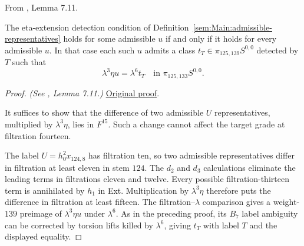 \begin{lemma}
\label{paper:7.11}
From \cite{LWX126}, Lemma 7.11.\par

\label{lem:equistate5}
The eta-extension detection condition of
Definition~\ref{sem:Main:admissible-representatives} holds for some
admissible $u$ if and only if it holds for every admissible $u$.
In that case each such $u$ admits a class
$t_T\in\pi_{125,139}S^{0,0}$ detected by $T$ such that
\[
 \lambda^3\eta u=\lambda^6t_T\quad\text{in }\pi_{125,133}S^{0,0}.
\]



\end{lemma}
\begin{proof}
\textit{(See \cite{LWX126}, Lemma 7.11.)} \href{paper/main.tex.html#L2254}{Original proof}.

It suffices to show that the difference of two admissible $U$
representatives, multiplied by $\lambda^3\eta$, lies in $F^{15}$.
Such a change cannot affect the target grade at filtration fourteen.

The label $U=h_0^2x_{124,8}$ has filtration ten, so two admissible
representatives differ in filtration at least eleven in stem $124$.
The $d_2$ and $d_3$ calculations eliminate the leading terms in
filtrations eleven and twelve. Every possible filtration-thirteen
term is annihilated by $h_1$ in Ext. Multiplication by $\lambda^3\eta$
therefore puts the difference in filtration at least fifteen.
The filtration--$\lambda$ comparison gives a weight-$139$ preimage of
$\lambda^3\eta u$ under $\lambda^6$. As in the preceding proof, its
$B_7$ label ambiguity can be corrected by torsion lifts killed by
$\lambda^6$, giving $t_T$ with label $T$ and the displayed equality.
\end{proof}

